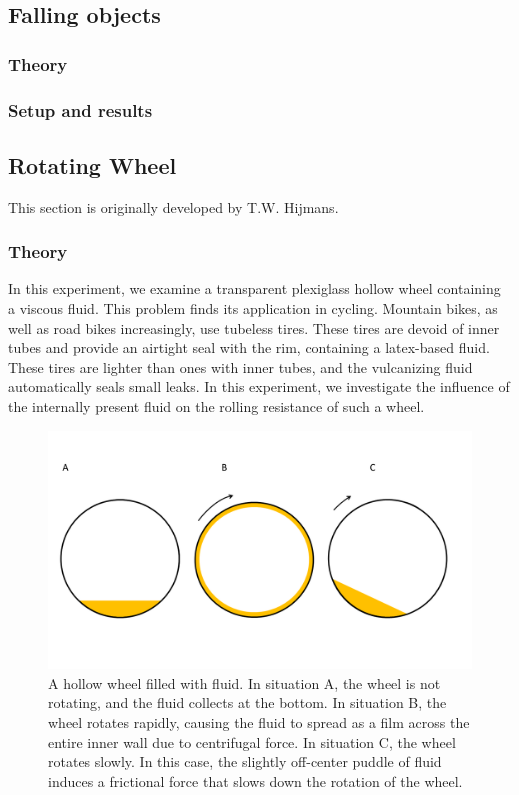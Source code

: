 \documentclass{article}
\begin{document}
\newpage

\subsection{Falling objects}
\subsubsection{Theory}
\subsubsection{Setup and results}

\newpage

\subsection{Rotating Wheel}
This section is originally developed by T.W. Hijmans.
\subsubsection{Theory}
In this experiment, we examine a transparent plexiglass hollow wheel containing a viscous fluid. This problem finds its application in cycling. Mountain bikes, as well as road bikes increasingly, use tubeless tires. These tires are devoid of inner tubes and provide an airtight seal with the rim, containing a latex-based fluid. These tires are lighter than ones with inner tubes, and the vulcanizing fluid automatically seals small leaks. In this experiment, we investigate the influence of the internally present fluid on the rolling resistance of such a wheel.

\begin{figure}[H]
    \centering
    \includegraphics[scale=0.35]{figures/wiel.png}
    \caption{A hollow wheel filled with fluid. In situation A, the wheel is not rotating, and the fluid collects at the bottom. In situation B, the wheel rotates rapidly, causing the fluid to spread as a film across the entire inner wall due to centrifugal force. In situation C, the wheel rotates slowly. In this case, the slightly off-center puddle of fluid induces a frictional force that slows down the rotation of the wheel.}
    \label{Fig. wheel}
\end{figure}
\end{document}
